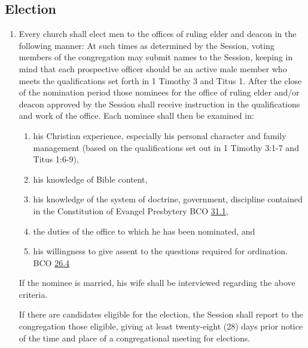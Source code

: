 \documentclass[
]{book}
\providecommand{\tightlist}{%
  \setlength{\itemsep}{0pt}\setlength{\parskip}{0pt}}
\begin{document}
\hypertarget{election}{%
\subsection*{\texorpdfstring{\protect\hypertarget{26}{\href{}{}}Election}{Election}}\label{election}}

\begin{enumerate}
\def\labelenumi{\arabic{enumi}.}
\item
  Every church shall elect men to the offices of ruling elder and deacon in the following manner: At such times as determined by the Session, voting members of the congregation may submit names to the Session, keeping in mind that each prospective officer should be an active male member who meets the qualifications set forth in 1 Timothy 3 and Titus 1. After the close of the nomination period those nominees for the office of ruling elder and/or deacon approved by the Session shall receive instruction in the qualifications and work of the office. Each nominee shall then be examined in:

  \begin{enumerate}
  \def\labelenumii{\alph{enumii}.}
  \tightlist
  \item
    his Christian experience, especially his personal character and family management (based on the qualifications set out in 1 Timothy 3:1-7 and Titus 1:6-9),
  \item
    his knowledge of Bible content,
  \item
    his knowledge of the system of doctrine, government, discipline contained in the Constitution of Evangel Presbytery BCO \protect\hyperlink{31.1}{31.1},
  \item
    the duties of the office to which he has been nominated, and
  \item
    his willingness to give assent to the questions required for ordination. BCO \protect\hyperlink{26.4}{26.4}
  \end{enumerate}

  If the nominee is married, his wife shall be interviewed regarding the above criteria.

  If there are candidates eligible for the election, the Session shall report to the congregation those eligible, giving at least twenty-eight (28) days prior notice of the time and place of a congregational meeting for elections.


\end{enumerate}
\end{document}
